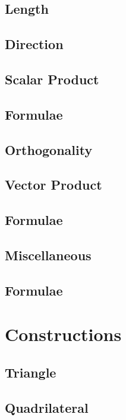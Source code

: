 \documentclass[journal]{IEEEtran}
\begin{document}
\subsection{Length}

%
\subsection{Direction}

\subsection{Scalar Product}

\subsection{Formulae}

\subsection{Orthogonality}

\subsection{Vector Product}

\subsection{Formulae}

\subsection{Miscellaneous}

\subsection{Formulae}

\newpage
\section{Constructions}
\subsection{Triangle}

\subsection{Quadrilateral}

\end{document}
